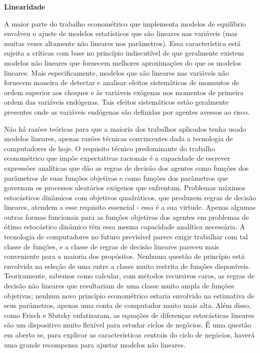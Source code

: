 \documentclass[a4paper,12pt]{article}[abntex2]
\begin{document}
\textbf{Linearidade}

A maior parte do trabalho econométrico que implementa modelos de equilíbrio envolveu o ajuste de modelos estatísticos que são lineares nas variáveis (mas muitas vezes altamente não lineares nos parâmetros). Essa característica está sujeita a críticas com base no princípio indiscutível de que geralmente existem modelos não lineares que fornecem melhores aproximações do que os modelos lineares. Mais especificamente, modelos que são lineares nas variáveis não fornecem maneira de detectar e analisar efeitos sistemáticos de momentos de ordem superior aos choques e às variáveis exógenas nos momentos de primeira ordem das variáveis endógenas. Tais efeitos sistemáticos estão geralmente presentes onde as variáveis endógenas são definidas por agentes avessos ao risco.

Não há razões teóricas para que a maioria dos trabalhos aplicados tenha usado modelos lineares, apenas razões técnicas convincentes dada a tecnologia de computadores de hoje. O requisito técnico predominante do trabalho econométrico que impõe expectativas racionais é a capacidade de escrever expressões analíticas que dão as regras de decisão dos agentes como funções dos parâmetros de suas funções objetivas e como funções dos parâmetros que governam os processos aleatórios exógenos que enfrentam. Problemas máximos estocásticos dinâmicos com objetivos quadráticos, que produzem regras de decisão lineares, atendem a esse requisito essencial - essa é a sua virtude. Apenas algumas outras formas funcionais para as funções objetivas dos agentes em problemas de ótimo estocástico dinâmico têm essa mesma capacidade analítica necessária. A tecnologia de computadores no futuro previsível parece exigir trabalhar com tal classe de funções, e a classe de regras de decisão lineares pareceu mais conveniente para a maioria dos propósitos. Nenhuma questão de princípio está envolvida na seleção de uma entre a classe muito restrita de funções disponíveis. Teoricamente, sabemos como calcular, com métodos recursivos caros, as regras de decisão não lineares que resultariam de uma classe muito ampla de funções objetivas; nenhum novo princípio econométrico estaria envolvido na estimativa de seus parâmetros, apenas uma conta de computador muito mais alta. Além disso, como Frisch e Slutsky enfatizaram, as equações de diferenças estocásticas lineares são um dispositivo muito flexível para estudar ciclos de negócios. É uma questão em aberto se, para explicar as características centrais do ciclo de negócios, haverá uma grande recompensa para ajustar modelos não lineares.
\end{document}
